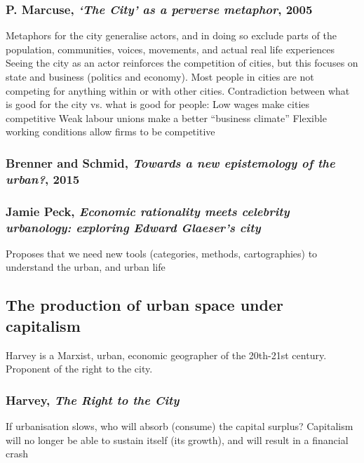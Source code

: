 \documentclass{article}
\begin{document}
\subsubsection{P. Marcuse, \textit{`The City' as a perverse metaphor}, 2005}

\begin{outline}
	\1 Metaphors for the city generalise actors, and in doing so exclude parts of the population, communities, voices, movements, and actual real life experiences
	\1 Seeing the city as an actor reinforces the competition of cities, but this focuses on state and business (politics and economy). Most people in cities are not competing for anything within or with other cities. 
	\1 Contradiction between what is good for the city vs. what is good for people:
		\2 Low wages make cities competitive
		\2 Weak labour unions make a better ``business climate''
		\2 Flexible working conditions allow firms to be competitive
\end{outline}

\subsubsection{Brenner and Schmid, \textit{Towards a new epistemology of the urban?}, 2015}

\subsubsection{Jamie Peck, \textit{Economic rationality meets celebrity urbanology: exploring Edward Glaeser's city}}

\begin{outline}
	\1 Proposes that we need new tools (categories, methods, cartographies) to understand the urban, and urban life
\end{outline}

\subsection{The production of urban space under capitalism}

Harvey is a Marxist, urban, economic geographer of the 20th-21st century. Proponent of the right to the city. 

\subsubsection{Harvey, \textit{The Right to the City}}

\begin{outline}
	\1 If urbanisation slows, who will absorb (consume) the capital surplus? Capitalism will no longer be able to sustain itself (its growth), and will result in a financial crash
\end{outline}
\end{document}
